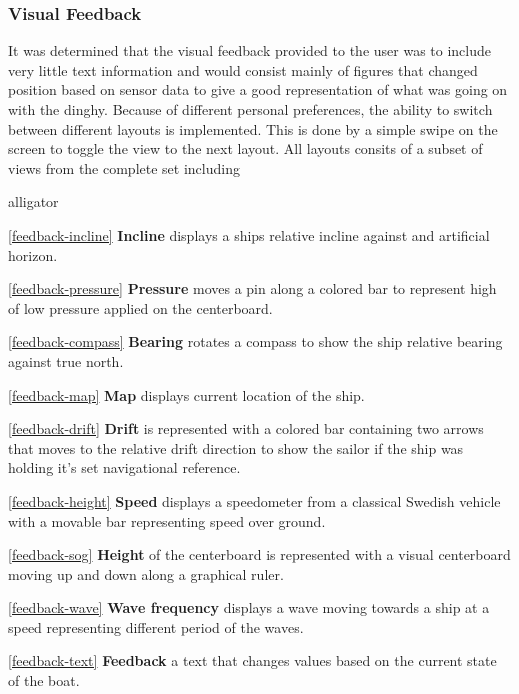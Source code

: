 \subsubsection{Visual Feedback}
It was determined that the visual feedback provided to the user was to include very little text information and would consist mainly of figures that changed position based on sensor data to give a good representation of what was going on with the dinghy. Because of different personal preferences, the ability to switch between different layouts is implemented. This is done by a simple swipe on the screen to toggle the view to the next layout. All layouts consits of a subset of views from the complete set including
\begin{labeling}{alligator}
\item [\ref{feedback-incline} \textbf{Incline}]  displays a ships relative incline against and artificial horizon.
\item [\ref{feedback-pressure} \textbf{Pressure}] moves a pin along a colored bar to represent high of low pressure applied on the centerboard.
\item [\ref{feedback-compass} \textbf{Bearing}] rotates a compass to show the ship relative bearing against true north.
\item [\ref{feedback-map} \textbf{Map}] displays current location of the ship.
\item [\ref{feedback-drift} \textbf{Drift}] is represented with a colored bar containing two arrows that moves to the relative drift direction to show the sailor if the ship was holding it's set navigational reference.
\item [\ref{feedback-height} \textbf{Speed}] displays a speedometer from a classical Swedish vehicle\cite{volvo} with a movable bar representing speed over ground.
\item [\ref{feedback-sog} \textbf{Height}] of the centerboard is represented with a visual centerboard moving up and down along a graphical ruler.
\item [\ref{feedback-wave} \textbf{Wave frequency}] displays a wave moving towards a ship at a speed representing different period of the waves.
\item [\ref{feedback-text} \textbf{Feedback}] a text that changes values based on the current state of the boat.
\end{labeling}

